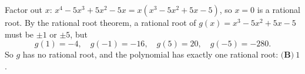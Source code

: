 Factor out $x$: $x^4-5x^3+5x^2-5x=x\left(x^3-5x^2+5x-5\right)$, so $x=0$ is a rational root. By the rational root theorem, a rational root of $g(x)=x^3-5x^2+5x-5$ must be $\pm1$ or $\pm5$, but
\[g(1)=-4,\quad g(-1)=-16,\quad g(5)=20,\quad g(-5)=-280.\]
So $g$ has no rational root, and the polynomial has exactly one rational root: $\boxed{\textbf{(B)}\ 1}$.
